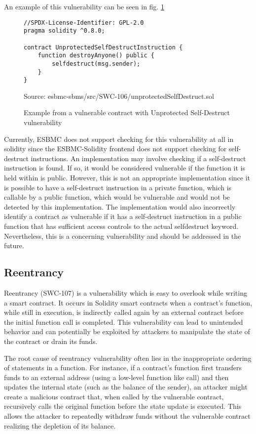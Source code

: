 An example of this vulnerability can be seen in fig. \ref{fig:unprotected_self_destruct}

\begin{figure}
\begin{lstlisting}
//SPDX-License-Identifier: GPL-2.0
pragma solidity ^0.8.0;

contract UnprotectedSelfDestructInstruction {
    function destroyAnyone() public {
        selfdestruct(msg.sender);
    }
}
\end{lstlisting}
\caption{Example from a vulnerable contract with Unprotected Self-Destruct vulnerability }
Source: esbmc-sbms/src/SWC-106/unprotectedSelfDestruct.sol
\label{fig:unprotected_self_destruct}
\end{figure}

Currently, ESBMC does not support checking for this vulnerability at all in solidity since the ESBMC-Solidity frontend does not support checking for self-destruct instructions. An implementation may involve checking if a self-destruct instruction is found. If so, it would be considered vulnerable if the function it is held within is public. However, this is not an appropriate implementation since it is possible to have a self-destruct instruction in a private function, which is callable by a public function, which would be vulnerable and would not be detected by this implementation. The implementation would also incorrectly identify a contract as vulnerable if it has a self-destruct instruction in a public function that has sufficient access controls to the actual selfdestruct keyword. Nevertheless, this is a concerning vulnerability and should be addressed in the future.

\subsection{Reentrancy}
\label{sec:reentrancy}

Reentrancy (SWC-107) is a vulnerability which is easy to overlook while writing a smart contract. It occurs in Solidity smart contracts when a contract's function, while still in execution, is indirectly called again by an external contract before the initial function call is completed. This vulnerability can lead to unintended behavior and can potentially be exploited by attackers to manipulate the state of the contract or drain its funds.

The root cause of reentrancy vulnerability often lies in the inappropriate ordering of statements in a function. For instance, if a contract's function first transfers funds to an external address (using a low-level function like call) and then updates the internal state (such as the balance of the sender), an attacker might create a malicious contract that, when called by the vulnerable contract, recursively calls the original function before the state update is executed. This allows the attacker to repeatedly withdraw funds without the vulnerable contract realizing the depletion of its balance.

